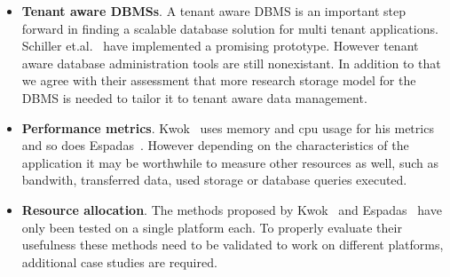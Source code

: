 \begin{itemize}
	\item \textbf{Tenant aware \acp{DBMS}}.
		A tenant aware \ac{DBMS} is an important step forward in finding a scalable database solution for multi tenant applications.
		Schiller et.al.~\cite{schiller2011native} have implemented a promising prototype. However tenant aware database administration tools are still nonexistant.
		In addition to that we agree with their assessment that more research storage model for the \ac{DBMS} is needed to tailor it to tenant aware data management.
	\item \textbf{Performance metrics}.
		Kwok~\cite{kwok2008resource} uses memory and cpu usage for his metrics and so does Espadas~\cite{espadas2013tenant}. 
		However depending on the characteristics of the application it may be worthwhile to measure other resources as well, such as bandwith, transferred data, used storage or database queries executed. 
	\item \textbf{Resource allocation}.
		The methods proposed by Kwok~\cite{kwok2008resource} and Espadas~\cite{espadas2013tenant} have only been tested on a single platform each.
		To properly evaluate their usefulness these methods need to be validated to work on different platforms, additional case studies are required.
\end{itemize}


